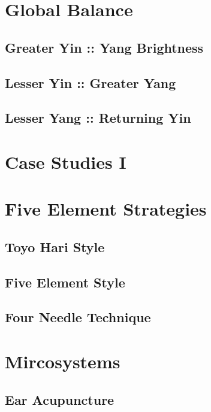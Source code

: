 \section{Global Balance}

\subsection{Greater Yin :: Yang Brightness}

\subsection{Lesser Yin :: Greater Yang}

\subsection{Lesser Yang :: Returning Yin}

\section{Case Studies I}

\section{Five Element Strategies}

\subsection{Toyo Hari Style}

\subsection{Five Element Style}

\subsection{Four Needle Technique}

\section{Mircosystems}

\subsection{Ear Acupuncture}

